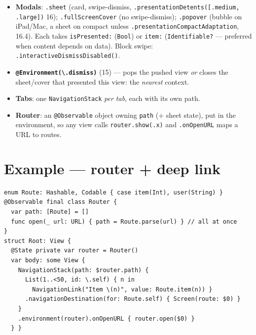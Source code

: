 \documentclass[8pt]{extarticle}
\begin{document}
\begin{multicols}{2}
\begin{itemize}
        (+\texttt{content}); selection drives the next column; \texttt{columnVisibility} binding;
        on compact width it \textbf{collapses into a stack} (\texttt{preferredCompactColumn}, 17).
  \item \textbf{Modals}: \texttt{.sheet} (card, swipe-dismiss, \texttt{.presentationDetents([.medium,
        .large])} 16); \texttt{.fullScreenCover} (no swipe-dismiss); \texttt{.popover} (bubble on iPad/Mac,
        a sheet on compact unless \texttt{.presentationCompactAdaptation}, 16.4). Each takes
        \texttt{isPresented:} (\texttt{Bool}) or \texttt{item:} (\texttt{Identifiable?} — preferred when
        content depends on data). Block swipe: \texttt{.interactiveDismissDisabled()}.
  \item \textbf{\texttt{@Environment(\textbackslash.dismiss)}} (15) — pops the pushed view \emph{or} closes the
        sheet/cover that presented this view: the \emph{nearest} context.
  \item \textbf{Tabs}: one \texttt{NavigationStack} \emph{per tab}, each with its own path.
  \item \textbf{Router}: an \texttt{@Observable} object owning \texttt{path} (+ sheet state), put in the
        environment, so any view calls \texttt{router.show(.x)} and \texttt{.onOpenURL} maps a URL to routes.
\end{itemize}

\section{Example — router + deep link}
\begin{lstlisting}[language=SwiftSheet]
enum Route: Hashable, Codable { case item(Int), user(String) }
@Observable final class Router {
  var path: [Route] = []
  func open(_ url: URL) { path = Route.parse(url) } // all at once
}
struct Root: View {
  @State private var router = Router()
  var body: some View {
    NavigationStack(path: $router.path) {
      List(1..<50, id: \.self) { n in
        NavigationLink("Item \(n)", value: Route.item(n)) }
      .navigationDestination(for: Route.self) { Screen(route: $0) }
    }
    .environment(router).onOpenURL { router.open($0) }
  } }
\end{lstlisting}

\columnbreak


\end{multicols}
\end{document}
